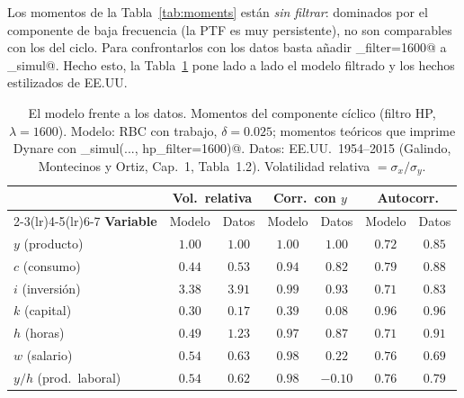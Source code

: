 \documentclass[11pt,a4paper]{report}
\begin{document}
Los momentos de la Tabla~\ref{tab:moments} están \emph{sin filtrar}: dominados por
el componente de baja frecuencia (la PTF es muy persistente), no son comparables
con los del ciclo. Para confrontarlos con los datos basta añadir
\lstinline@hp_filter=1600@ a \lstinline@stoch_simul@. Hecho esto, la
Tabla~\ref{tab:vsdata} pone lado a lado el modelo filtrado y los hechos
estilizados de EE.UU.

\begin{table}[H]
\centering\small
\begin{tabular}{l cc cc cc}
\toprule
 & \multicolumn{2}{c}{\textbf{Vol.\ relativa}} & \multicolumn{2}{c}{\textbf{Corr.\ con $y$}} & \multicolumn{2}{c}{\textbf{Autocorr.}}\\
\cmidrule(lr){2-3}\cmidrule(lr){4-5}\cmidrule(lr){6-7}
\textbf{Variable} & Modelo & Datos & Modelo & Datos & Modelo & Datos\\
\midrule
$y$ (producto)          & $1.00$ & $1.00$ & $1.00$ & $1.00$  & $0.72$ & $0.85$\\
$c$ (consumo)           & $0.44$ & $0.53$ & $0.94$ & $0.82$  & $0.79$ & $0.88$\\
$i$ (inversión)         & $3.38$ & $3.91$ & $0.99$ & $0.93$  & $0.71$ & $0.83$\\
$k$ (capital)           & $0.30$ & $0.17$ & $0.39$ & $0.08$  & $0.96$ & $0.96$\\
$h$ (horas)             & $0.49$ & $1.23$ & $0.97$ & $0.87$  & $0.71$ & $0.91$\\
$w$ (salario)           & $0.54$ & $0.63$ & $0.98$ & $0.22$  & $0.76$ & $0.69$\\
$y/h$ (prod.\ laboral)  & $0.54$ & $0.62$ & $0.98$ & $-0.10$ & $0.76$ & $0.79$\\
\bottomrule
\end{tabular}
\caption{El modelo frente a los datos. Momentos del componente cíclico (filtro
HP, $\lambda=1600$). Modelo: RBC con trabajo, $\delta=0.025$; momentos teóricos que
imprime Dynare con \lstinline@stoch_simul(..., hp_filter=1600)@. Datos:
EE.UU.\ 1954--2015 (Galindo, Montecinos y Ortiz, Cap.~1, Tabla~1.2). Volatilidad
relativa $=\sigma_x/\sigma_y$.}
\label{tab:vsdata}
\end{table}
\end{document}

